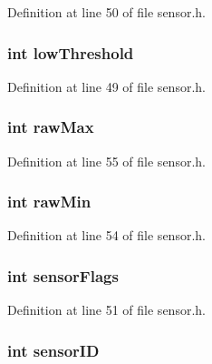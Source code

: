 Definition at line 50 of file sensor.h.

\hypertarget{struct_s_e_n_s_o_r_adee8a51df0a70d2da05676949d00739c}{
\subsubsection[{lowThreshold}]{\setlength{\rightskip}{0pt plus 5cm}int {\bf lowThreshold}}}
\label{struct_s_e_n_s_o_r_adee8a51df0a70d2da05676949d00739c}


Definition at line 49 of file sensor.h.

\hypertarget{struct_s_e_n_s_o_r_a41342808d68e41ec08389c2b11caa6e5}{
\subsubsection[{rawMax}]{\setlength{\rightskip}{0pt plus 5cm}int {\bf rawMax}}}
\label{struct_s_e_n_s_o_r_a41342808d68e41ec08389c2b11caa6e5}


Definition at line 55 of file sensor.h.

\hypertarget{struct_s_e_n_s_o_r_a9950c3a4594e60d047b85d20396b3be7}{
\subsubsection[{rawMin}]{\setlength{\rightskip}{0pt plus 5cm}int {\bf rawMin}}}
\label{struct_s_e_n_s_o_r_a9950c3a4594e60d047b85d20396b3be7}


Definition at line 54 of file sensor.h.

\hypertarget{struct_s_e_n_s_o_r_a7ec77f6117dfdcd4c1716ad10b6e8fe7}{
\subsubsection[{sensorFlags}]{\setlength{\rightskip}{0pt plus 5cm}int {\bf sensorFlags}}}
\label{struct_s_e_n_s_o_r_a7ec77f6117dfdcd4c1716ad10b6e8fe7}


Definition at line 51 of file sensor.h.

\hypertarget{struct_s_e_n_s_o_r_a4f5a5e2cb7ee061dd0bd29b7086d89ac}{
\subsubsection[{sensorID}]{\setlength{\rightskip}{0pt plus 5cm}int {\bf sensorID}}}
\label{struct_s_e_n_s_o_r_a4f5a5e2cb7ee061dd0bd29b7086d89ac}


